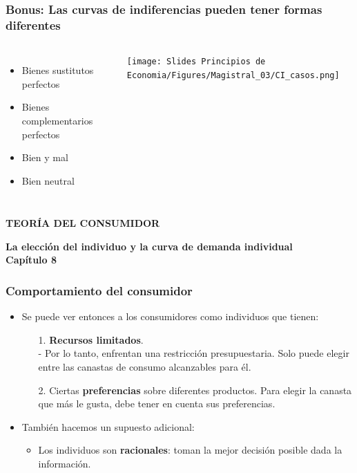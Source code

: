 \documentclass{beamer}
\begin{document}
\begin{frame}
\frametitle{Bonus: Las curvas de indiferencias pueden tener formas diferentes}
\begin{columns}
    \begin{itemize}
        \item Bienes sustitutos perfectos
        \item Bienes complementarios perfectos
        \item Bien y mal
        \item Bien neutral
    \end{itemize}

    \texttt{[image: Slides Principios de Economia/Figures/Magistral\_03/CI\_casos.png]}
\end{columns}


\end{frame}

\begin{frame}
    \centering
    \begin{boxB}
    \centering \Large \textbf{TEORÍA DEL CONSUMIDOR} \\   
    \end{boxB}
     \vspace{2mm}
    \Large \textbf{La elección del individuo y la curva de demanda individual} \\
     \vspace{5mm}
    \large \textbf{Capítulo 8}
\end{frame}

\begin{frame}
\frametitle{Comportamiento del consumidor}
\begin{itemize}
    \item Se puede ver entonces a los consumidores como individuos que tienen: \vspace{-2mm}
    \begin{itemize}
        \item[1.] \textbf{Recursos limitados}. \\
        - Por lo tanto, enfrentan una restricción presupuestaria. Solo puede elegir entre las canastas de consumo alcanzables
        para él. \vspace{2mm}
        \item[2.] Ciertas \textbf{preferencias} sobre diferentes productos. Para elegir la canasta que más le gusta, debe tener en cuenta
        sus preferencias. \\ \vspace{2mm}
    \end{itemize}
    
    \item También hacemos un supuesto adicional: \vspace{2mm}
    \begin{itemize}
    \item Los individuos son \textbf{racionales}: toman la mejor decisión posible dada la información.
    \end{itemize}
\end{itemize} 
\end{frame}
\end{document}
